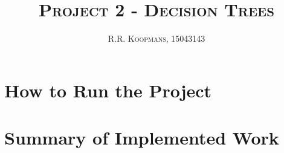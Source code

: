 \documentclass[10pt,a4paper]{article}
\author{\textsc{R.R. Koopmans, 15043143}}
\title{\textsc{Project 2 - Decision Trees}}
\begin{document}
\maketitle
	\section{How to Run the Project}
	\section{Summary of Implemented Work}
\end{document}
